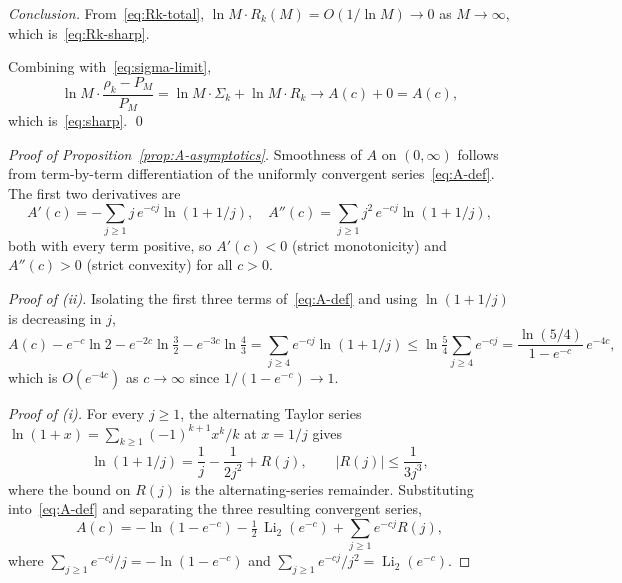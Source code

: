 \documentclass[11pt]{article}
\theoremstyle{remark}
\DeclareMathOperator{\Li}{Li}
\begin{document}
\emph{Conclusion.}
From~\eqref{eq:Rk-total}, $\ln M \cdot R_k(M) = O(1/\ln M) \to 0$ as $M \to \infty$, which is~\eqref{eq:Rk-sharp}.

Combining with~\eqref{eq:sigma-limit},
\[
\ln M \cdot \frac{\rho_k - P_M}{P_M} = \ln M \cdot \Sigma_k + \ln M \cdot R_k \longrightarrow A(c) + 0 = A(c),
\]
which is~\eqref{eq:sharp}. \qed

\begin{proof}[Proof of Proposition~\ref{prop:A-asymptotics}]
Smoothness of $A$ on $(0, \infty)$ follows from term-by-term differentiation of the uniformly convergent series~\eqref{eq:A-def}. The first two derivatives are
\[
A'(c) = -\sum_{j \geq 1} j\, e^{-cj} \ln(1 + 1/j), \quad A''(c) = \sum_{j \geq 1} j^2\, e^{-cj} \ln(1 + 1/j),
\]
both with every term positive, so $A'(c) < 0$ (strict monotonicity) and $A''(c) > 0$ (strict convexity) for all $c > 0$.

\emph{Proof of (ii).} Isolating the first three terms of~\eqref{eq:A-def} and using $\ln(1 + 1/j)$ is decreasing in $j$,
\[
A(c) - e^{-c} \ln 2 - e^{-2c} \ln \tfrac{3}{2} - e^{-3c}\ln\tfrac{4}{3} = \sum_{j \geq 4} e^{-cj} \ln(1 + 1/j) \leq \ln \tfrac{5}{4} \sum_{j \geq 4} e^{-cj} = \frac{\ln(5/4)}{1 - e^{-c}}\, e^{-4c},
\]
which is $O(e^{-4c})$ as $c \to \infty$ since $1/(1 - e^{-c}) \to 1$.

\emph{Proof of (i).} For every $j \geq 1$, the alternating Taylor series $\ln(1 + x) = \sum_{k \geq 1}(-1)^{k+1} x^k/k$ at $x = 1/j$ gives
\begin{equation}\label{eq:log-Taylor}
\ln(1 + 1/j) = \frac{1}{j} - \frac{1}{2j^2} + R(j), \qquad |R(j)| \leq \frac{1}{3 j^3},
\end{equation}
where the bound on $R(j)$ is the alternating-series remainder. Substituting into~\eqref{eq:A-def} and separating the three resulting convergent series,
\begin{equation}\label{eq:A-decomp}
A(c) = -\ln(1 - e^{-c}) - \tfrac12\, \Li_2(e^{-c}) + \sum_{j \geq 1} e^{-cj} R(j),
\end{equation}
where $\sum_{j \geq 1} e^{-cj}/j = -\ln(1 - e^{-c})$ and $\sum_{j \geq 1} e^{-cj}/j^2 = \Li_2(e^{-c})$.


\end{proof}
\end{document}
